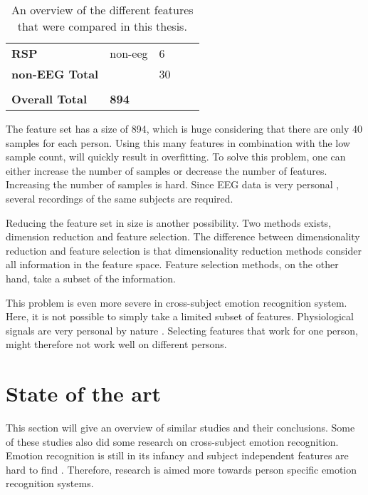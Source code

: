 \begin{table}[]
\begin{tabular}{lllll}
\textbf{RSP}            & non-eeg       & 6                             &                           &              \\
\textbf{non-EEG Total}  &               & 30                            &                           &              \\
                        &               &                               &                           &              \\
\textbf{Overall Total}  & \textbf{894}  &                               &                           &             
\end{tabular}
\caption{An overview of the different features that were compared in this thesis.\label{featOverviewTable}}
\end{table}

The feature set has a size of 894, which is huge considering that there are only 40 samples for each person. Using this many features in combination with the low sample count, will quickly result in overfitting\citep{prml}. To solve this problem, one can either increase the number of samples or decrease the number of features. Increasing the number of samples is hard. Since EEG data is very personal \citep{DEAP}, several recordings of the same subjects are required. 

\npar

Reducing the feature set in size is another possibility. Two methods exists, dimension reduction and feature selection. The difference between dimensionality reduction and feature selection is that dimensionality reduction methods consider all information in the feature space. Feature selection methods, on the other hand, take a subset of the information\citep{PhytoEm}.

\npar

This problem is even more severe in cross-subject emotion recognition system. Here, it is not possible to simply take a limited subset of features. Physiological signals are very personal by nature \citep{DEAP}. Selecting features that work for one person, might therefore not work well on different persons.

\section{State of the art}
This section will give an overview of similar studies and their conclusions. Some of these studies also did some research on cross-subject emotion recognition. Emotion recognition is still in its infancy\citep{emorecoghard} and subject independent features are hard to find \citep{DEAP}. Therefore, research is aimed more towards person specific emotion recognition systems.

